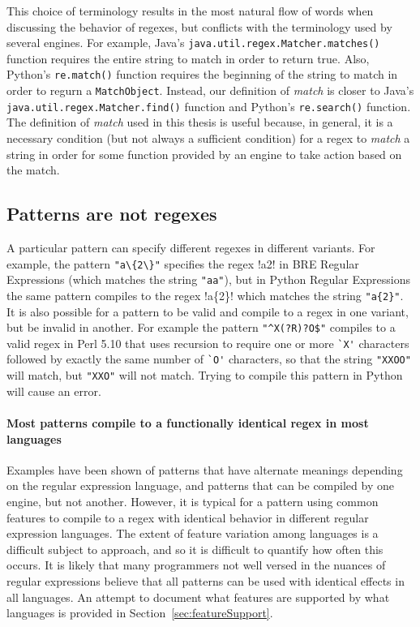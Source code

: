 This choice of terminology results in the most natural flow of words when discussing the behavior of regexes, but conflicts with the terminology used by several engines.  For example, Java's {\tt java.util.regex.Matcher.matches()} function requires the entire string to match in order to return true.  Also, Python's {\tt re.match()} function requires the beginning of the string to match in order to regurn a {\tt MatchObject}.  Instead, our definition of \emph{match} is closer to Java's {\tt java.util.regex.Matcher.find()} function and Python's {\tt re.search()} function.  The definition of \emph{match} used in this thesis is useful because, in general, it is a necessary condition (but not always a sufficient condition) for a regex to \emph{match} a string in order for some function provided by an engine to take action based on the match.

\subsection{Patterns are not regexes}
A particular pattern can specify different regexes in different variants.  For example, the pattern \verb!"a\{2\}"! specifies the regex \cverb!a{2}! in BRE Regular Expressions (which matches the string \verb!"aa"!), but in Python Regular Expressions the same pattern compiles to the regex \cverb!a\{2\}! which matches the string \verb!"a{2}"!.
It is also possible for a pattern to be valid and compile to a regex in one variant, but be invalid in another.  For example the pattern \verb!"^X(?R)?O$"! compiles to a valid regex in Perl 5.10 that uses recursion to require one or more \verb!`X'! characters followed by exactly the same number of \verb!`O'! characters, so that the string \verb!"XXOO"! will match, but \verb!"XXO"! will not match.  Trying to compile this pattern in Python will cause an error.

\paragraph{Most patterns compile to a functionally identical regex in most languages}
\label{sec:usuallyOk} Examples have been shown of patterns that have alternate meanings depending on the regular expression language, and patterns that can be compiled by one engine, but not another.  However, it is typical for a pattern using common features to compile to a regex with identical behavior in different regular expression languages.  The extent of feature variation among languages is a difficult subject to approach, and so it is difficult to quantify how often this occurs.  It is likely that many programmers not well versed in the nuances of regular expressions believe that all patterns can be used with identical effects in all languages.  An attempt to document what features are supported by what languages is provided in Section~\ref{sec:featureSupport}.

